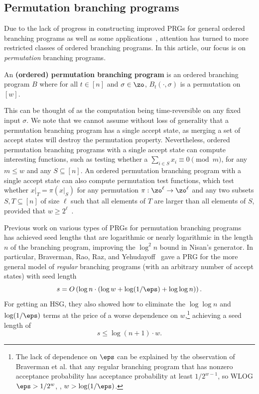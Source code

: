 \documentclass{toc}
\begin{document}
	
\subsection{Permutation branching programs}\label{subsec:PBP_overview}

Due to the lack of progress in constructing improved PRGs for general ordered branching programs as well as some applications~\cite{Indyk06,KaplanNaRe05}, attention has turned to more restricted classes of ordered branching programs.  In this %
article, %
our focus is on \emph{permutation} branching programs. %
	
	\begin{definition}\label{def:prbp}An \textbf{(ordered) permutation branching program} is an ordered branching program $B$ where for all $t \in [n]$ and $\sigma \in \zo$, $B_t(\cdot,\sigma)$ is a permutation on $[w]$. 
	\end{definition}
	This can be thought of as the computation being time-reversible on any fixed input $\sigma$. We note that we cannot assume without loss of generality that a permutation branching program has a single accept state, as merging a set of accept states will destroy the permutation property. Nevertheless, ordered permutation branching programs with a single accept state can compute interesting functions, such as testing
	whether a $\sum_{i\in S} x_i \equiv 0 \pmod m$, for any $m\leq w$ and any $S\subseteq [n]$.  An ordered permutation branching program with a single accept state can also compute permutation test functions, which test whether $x|_T = \pi(x|_S)$ for any permutation $\pi : \zo^\ell\rightarrow \zo^\ell$ and any two subsets $S,T\subseteq [n]$ of size $\ell$ such that all elements of $T$ are larger than all elements of $S$, provided that $w\geq 2^{\ell}$~\cite{HozaPyVa21}.
	
	Previous %
work %
on various types of PRGs for permutation branching programs~\cite{RozenmanVa05,ReingoldTrVa06,BravermanRaRaYe10,KouckyNiPu11,De11,Steinke12,HozaPyVa21} %
has  %
achieved seed lengths that are logarithmic or nearly logarithmic in the length $n$ of the branching program, improving the $\log^2 n$ bound in Nisan's generator. In particular, Braverman, Rao,
Raz, and Yehudayoff~\cite{BravermanRaRaYe10} gave a PRG for the more general model of \emph{regular} branching programs (with an arbitrary number of accept states) with seed length
	$$s=O\left(\log n\cdot (\log w + \log(1/\eps)+\log\log n)\right).$$
For getting an %
    HSG, they also showed how to %
    eliminate
	the $\log\log n$ and $\log(1/\eps)$ terms at the price of a worse dependence on $w$,\footnote{The lack of dependence on $\eps$ can be explained by the observation of Braverman et al. that any regular branching program that 
	has nonzero acceptance probability has acceptance probability at least
	$1/2^{w-1}$, so WLOG $\eps> 1/2^w$, \ie, $w> \log(1/\eps)$.} 
	achieving a seed length of
	$$s\leq \log(n+1) \cdot w.$$
\end{document}
